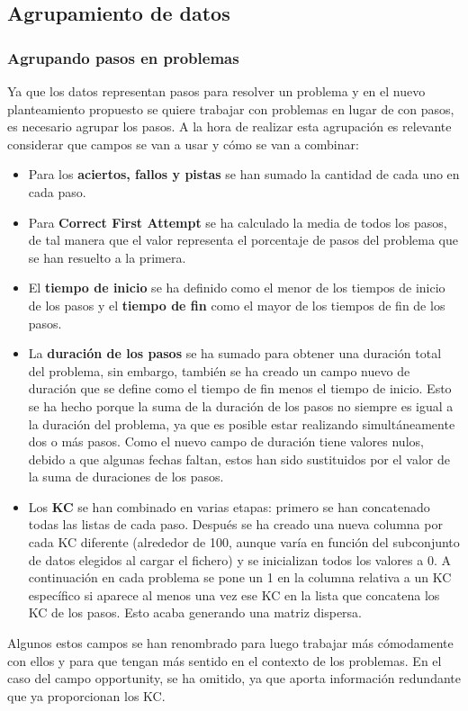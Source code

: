 \documentclass[acmtog, screen]{acmart}
\begin{document}
\subsection{Agrupamiento de datos}
\subsubsection{Agrupando pasos en problemas}
Ya que los datos representan pasos para resolver un problema y en el nuevo planteamiento propuesto se quiere trabajar con problemas en lugar de con pasos, es necesario agrupar los pasos. A la hora de realizar esta agrupación es relevante considerar que campos se van a usar y cómo se van a combinar:
\begin{itemize}
	\item Para los \textbf{aciertos, fallos y pistas} se han sumado la cantidad de cada uno en cada paso.
	\item Para \textbf{Correct First Attempt} se ha calculado la media de todos los pasos, de tal manera que el valor representa el porcentaje de pasos del problema que se han resuelto a la primera.
	\item El \textbf{tiempo de inicio} se ha definido como el menor de los tiempos de inicio de los pasos y el \textbf{tiempo de fin} como el mayor de los tiempos de fin de los pasos.
	\item La \textbf{duración de los pasos} se ha sumado para obtener una duración total del problema, sin embargo, también se ha creado un campo nuevo de duración que se define como el tiempo de fin menos el tiempo de inicio. Esto se ha hecho porque la suma de la duración de los pasos no siempre es igual a la duración del problema, ya que es posible estar realizando simultáneamente dos o más pasos. Como el nuevo campo de duración tiene valores nulos, debido a que algunas fechas faltan, estos han sido sustituidos por el valor de la suma de duraciones de los pasos.
	\item Los \textbf{KC} se han combinado en varias etapas: primero se han concatenado todas las listas de cada paso. Después se ha creado una nueva columna por cada KC diferente (alrededor de 100, aunque varía en función del subconjunto de datos elegidos al cargar el fichero) y se inicializan todos los valores a 0. A continuación en cada problema se pone un 1 en la columna relativa a un KC específico si aparece al menos una vez ese KC en la lista que concatena los KC de los pasos. Esto acaba generando una matriz dispersa.
\end{itemize}
Algunos estos campos se han renombrado para luego trabajar más cómodamente con ellos y para que tengan más sentido en el contexto de los problemas. En el caso del campo opportunity, se ha omitido, ya que aporta información redundante que ya proporcionan los KC.
\end{document}
